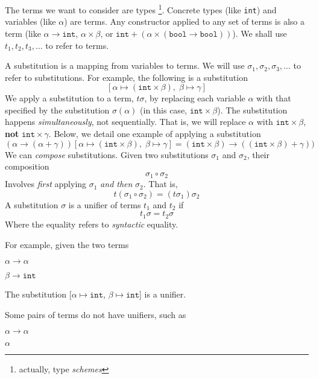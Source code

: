{The terms we want to consider are types \footnote{actually, type \textit{schemes}}. Concrete types (like \texttt{int}) and variables (like $\alpha$) are terms. Any constructor applied to any set of terms is also a term (like $\alpha \to \texttt{int}$, $\alpha \times \beta$, or $\texttt{int} + (\alpha \times (\texttt{bool} \to \texttt{bool}))$). We shall use $t_1, t_2, t_3, \ldots$ to refer to terms.

A substitution is a mapping from variables to terms. We will use $\sigma_1, \sigma_2, \sigma_3, \ldots$ to refer to substitutions. For example, the following is a substitution
\[[\alpha \mapsto (\texttt{int} \times \beta), \; \beta \mapsto \gamma]\]
We apply a substitution to a term, $t \sigma$, by replacing each variable $\alpha$ with that specified by the substitution $\sigma(\alpha)$ (in this case, $ \texttt{int} \times \beta$). The substitution happens \textit{simultaneously}, not sequentially. That is, we will replace $\alpha$ with $\texttt{int} \times \beta$, \textbf{not} $\texttt{int} \times \gamma$. Below, we detail one example of applying a substitution 
\[(\alpha \to (\alpha + \gamma))[\alpha \mapsto (\texttt{int} \times \beta), \; \beta \mapsto \gamma] = (\texttt{int} \times \beta) \to ((\texttt{int} \times \beta) + \gamma))\]
%
We can \textit{compose} substitutions. Given two substitutions $\sigma_1$ and $\sigma_2$, their composition 
\[\sigma_1 \circ \sigma_2\]
Involves \textit{first} applying $\sigma_1$ \textit{and then} $\sigma_2$. That is, 
\[t (\sigma_1 \circ \sigma_2) = (t \sigma_1) \sigma_2 \]
%
A substitution $\sigma$ is a unifier of terms $t_1$ and $t_2$ if
\[t_1 \sigma = t_2 \sigma\]
Where the equality refers to \textit{syntactic} equality. 

For example, given the two terms

\begin{minipage}[t]{0.5\textwidth}
\centering
$\alpha \to \alpha$
\end{minipage}%
\begin{minipage}[t]{0.5\textwidth}
\centering
$\beta \to \texttt{int}$
\end{minipage}

The substitution [$\alpha \mapsto \texttt{int}$, $\beta \mapsto \texttt{int}$] is a unifier.

Some pairs of terms do not have unifiers, such as

\begin{minipage}[t]{0.5\textwidth}
\centering
$\alpha \to \alpha$
\end{minipage}%
\begin{minipage}[t]{0.5\textwidth}
\centering
$\alpha$
\end{minipage}

}
